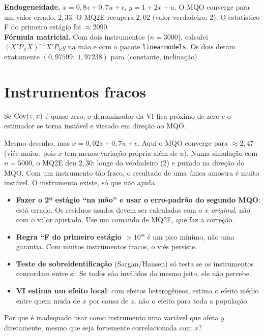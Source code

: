 \begin{simulacao}
\textbf{Endogeneidade.} $x=0{,}8z+0{,}7u+\epsilon$, $y=1+2x+u$. O MQO converge para um valor errado, $2{,}33$. O MQ2E recupera $2{,}02$ (valor verdadeiro: 2). O estatístico F do primeiro estágio foi $\approx2090$.\\
\textbf{Fórmula matricial.} Com dois instrumentos ($n=3000$), calculei $(X'P_ZX)^{-1}X'P_Zy$ na mão e com o pacote \texttt{linearmodels}. Os dois deram exatamente $(0{,}97599;\ 1{,}97238)$ para (constante, inclinação).
\end{simulacao}

\section{Instrumentos fracos}
Se $\operatorname{Cov}(z,x)$ é quase zero, o denominador da VI fica próximo de zero e o estimador se torna instável e viesado em direção ao MQO.

\begin{simulacao}
Mesmo desenho, mas $x=0{,}02z+0{,}7u+\epsilon$. Aqui o MQO converge para $\approx2{,}47$ (viés maior, pois $x$ tem menos variação própria além de $u$). Numa simulação com $n=5000$, o MQ2E deu $2{,}30$: longe do verdadeiro (2) e puxado na direção do MQO. Com um instrumento tão fraco, o resultado de uma única amostra é muito instável. O instrumento existe, só que não ajuda.
\end{simulacao}

\begin{atencao}
\begin{itemize}[leftmargin=1.2em]
\item \textbf{Fazer o 2º estágio ``na mão'' e usar o erro-padrão do segundo MQO}: está errado. Os resíduos usados devem ser calculados com o $x$ \emph{original}, não com o valor ajustado. Use um comando de MQ2E, que faz a correção.
\item \textbf{Regra ``F do primeiro estágio $>10$''} é um piso mínimo, não uma garantia. Com muitos instrumentos fracos, o viés persiste.
\item \textbf{Teste de sobreidentificação} (Sargan/Hansen) só testa se os instrumentos concordam entre si. Se todos são inválidos do mesmo jeito, ele não percebe.
\item \textbf{VI estima um efeito local}: com efeitos heterogêneos, estima o efeito médio entre quem muda de $x$ por causa de $z$, não o efeito para toda a população.
\end{itemize}
\end{atencao}

\begin{exercicio}
Por que é inadequado usar como instrumento uma variável que afeta $y$ diretamente, mesmo que seja fortemente correlacionada com $x$?
\end{exercicio}

